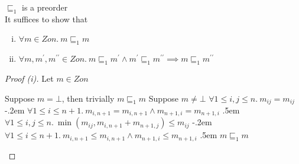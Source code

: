 \begin{prop}
  $\sqsubseteq_1$ is a preorder\\
  It suffices to show that
  \begin{enumerate}[(i)]
    \item $\forall m\in\mathit{Zon}.~m\sqsubseteq_1 m$
    \item $\forall m,m^\prime,m^{\prime\prime}\in\mathit{Zon}.~m\sqsubseteq_1m^\prime\wedge m^\prime\sqsubseteq_1m^{\prime\prime}\implies m\sqsubseteq_1m^{\prime\prime}$
  \end{enumerate}

  \begin{proof}[Proof (i)]
    Let $m\in\mathit{Zon}$\\
    \begin{itemize}
      \step Suppose $m=\bot$, then trivially $m\sqsubseteq_1m$
      \step Suppose $m\neq\bot$
      \step[\imps] $\forall1\leq i,j\leq n.~m_{ij} = m_{ij}$
      \itemsep-.2em
      \step[\wedge] $\forall1\leq i \leq n+1.~ m_{i,n+1} = m_{i,n+1}\wedge m_{n+1,i}=m_{n+1,i}$
      \itemsep.5em
      \step[\imps] $\forall1\leq i,j\leq n.~\min(m_{ij},m_{i,n+1}+m_{n+1,j}) \leq m_{ij}$
      \itemsep-.2em
      \step[\wedge] $\forall1\leq i \leq n+1.~ m_{i,n+1} \leq m_{i,n+1}\wedge m_{n+1,i}\leq m_{n+1,i}$
      \itemsep.5em
      \step[\imps] $m\sqsubseteq_1m$\qedhere
    \end{itemize}
  \end{proof}


\end{prop}
